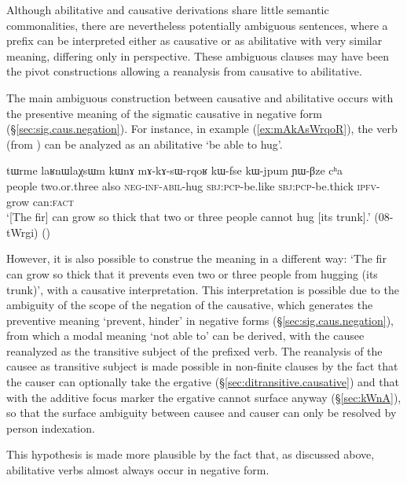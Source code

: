 Although abilitative and causative derivations share little semantic commonalities, there are nevertheless potentially ambiguous sentences, where a  prefix can be interpreted either as causative or as abilitative with very similar meaning, differing only in perspective. These ambiguous clauses may have been the pivot constructions allowing a reanalysis from causative to abilitative.

The main ambiguous construction between causative and abilitative occurs with the presentive meaning of the sigmatic causative in negative form (§\ref{sec:sig.caus.negation}). For instance, in example (\ref{ex:mAkAsWrqoR}), the verb  (from ) can be analyzed as an abilitative `be able to hug'.


 \begin{exe}
\ex \label{ex:mAkAsWrqoR}
\gll tɯrme laʁnɯlaχsɯm kɯnɤ mɤ-kɤ-sɯ-rqoʁ kɯ-fse kɯ-jpum ɲɯ-βze cʰa  \\
people two.or.three also \textsc{neg}-\textsc{inf}-\textsc{abil}-hug \textsc{sbj}:\textsc{pcp}-be.like \textsc{sbj}:\textsc{pcp}-be.thick \textsc{ipfv}-grow can\textsc{:fact} \\
\glt  `[The fir] can grow so thick that two or three people cannot hug [its trunk].' (08-tWrgi)
()
   \end{exe}

However, it is also possible to construe the meaning in a different way: `The fir can grow so thick that it prevents even two or three people from hugging (its trunk)', with a causative interpretation. This interpretation is possible due to the ambiguity of the scope of the negation of the causative, which generates the preventive meaning `prevent, hinder' in negative forms (§\ref{sec:sig.caus.negation}), from which a modal meaning `not able to' can be derived, with the causee reanalyzed as the transitive subject of the  prefixed verb. The reanalysis of the causee as transitive subject is made possible in non-finite clauses by the fact that the causer can optionally take the ergative (§\ref{sec:ditransitive.causative}) and that with the additive focus marker  the ergative cannot surface anyway (§\ref{sec:kWnA}), so that the surface ambiguity between causee and causer can only be resolved by person indexation. 

This hypothesis is made more plausible by the fact that, as discussed above, abilitative verbs almost always occur in negative form.

